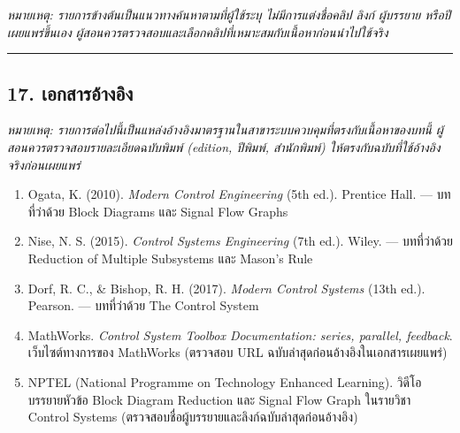 \textit{หมายเหตุ: รายการข้างต้นเป็นแนวทางค้นหาตามที่ผู้ใช้ระบุ ไม่มีการแต่งชื่อคลิป ลิงก์ ผู้บรรยาย หรือปีเผยแพร่ขึ้นเอง ผู้สอนควรตรวจสอบและเลือกคลิปที่เหมาะสมกับเนื้อหาก่อนนำไปใช้จริง}

\par\noindent\rule{\textwidth}{0.4pt}\par

\subsection{17. เอกสารอ้างอิง}

\textit{หมายเหตุ: รายการต่อไปนี้เป็นแหล่งอ้างอิงมาตรฐานในสาขาระบบควบคุมที่ตรงกับเนื้อหาของบทนี้ ผู้สอนควรตรวจสอบรายละเอียดฉบับพิมพ์ (edition, ปีพิมพ์, สำนักพิมพ์) ให้ตรงกับฉบับที่ใช้อ้างอิงจริงก่อนเผยแพร่}

\begin{enumerate}
    \item Ogata, K. (2010). \textit{Modern Control Engineering} (5th ed.). Prentice Hall. — บทที่ว่าด้วย Block Diagrams และ Signal Flow Graphs
    \item Nise, N. S. (2015). \textit{Control Systems Engineering} (7th ed.). Wiley. — บทที่ว่าด้วย Reduction of Multiple Subsystems และ Mason's Rule
    \item Dorf, R. C., \& Bishop, R. H. (2017). \textit{Modern Control Systems} (13th ed.). Pearson. — บทที่ว่าด้วย The Control System
    \item MathWorks. \textit{Control System Toolbox Documentation: series, parallel, feedback}. เว็บไซต์ทางการของ MathWorks (ตรวจสอบ URL ฉบับล่าสุดก่อนอ้างอิงในเอกสารเผยแพร่)
    \item NPTEL (National Programme on Technology Enhanced Learning). วิดีโอบรรยายหัวข้อ Block Diagram Reduction และ Signal Flow Graph ในรายวิชา Control Systems (ตรวจสอบชื่อผู้บรรยายและลิงก์ฉบับล่าสุดก่อนอ้างอิง)
\end{enumerate}
